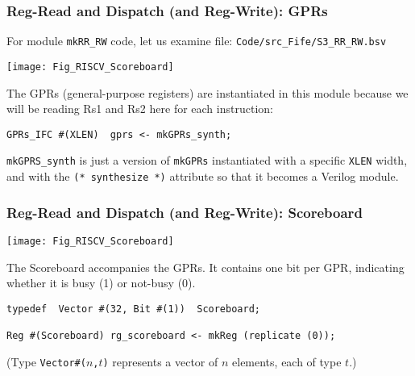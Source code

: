 \begin{frame}[fragile]
\frametitle{Reg-Read and Dispatch (and Reg-Write): GPRs}

\footnotesize

For module {\tt mkRR\_RW} code, let us examine file: {\tt Code/src\_Fife/S3\_RR\_RW.bsv}

\begin{center}
 \texttt{[image: Fig\_RISCV\_Scoreboard]}
\end{center}

\vspace{2ex}

The GPRs (general-purpose registers) are instantiated in this module
because we will be reading Rs1 and Rs2 here for each instruction:

\vspace{2ex}

\begin{Verbatim}[frame=single, label=From src\_Fife/CPU.bsv]
   GPRs_IFC #(XLEN)  gprs <- mkGPRs_synth;
\end{Verbatim}

\vspace{2ex}

{\tt mkGPRS\_synth} is just a version of {\tt mkGPRs} instantiated
with a specific {\tt XLEN} width, and with the {\tt (* synthesize *)}
attribute so that it becomes a Verilog module.

\end{frame}


\begin{frame}[fragile]
\frametitle{Reg-Read and Dispatch (and Reg-Write): Scoreboard}

\footnotesize

\begin{center}
 \texttt{[image: Fig\_RISCV\_Scoreboard]}
\end{center}

\vspace{2ex}

The Scoreboard accompanies the GPRs.  It contains one bit per GPR,
indicating whether it is busy (1) or not-busy (0).

\vspace{2ex}

\begin{Verbatim}[frame=single, label=From src\_Fife/CPU.bsv]
typedef  Vector #(32, Bit #(1))  Scoreboard;

Reg #(Scoreboard) rg_scoreboard <- mkReg (replicate (0));
\end{Verbatim}

\vspace{2ex}

(Type {\tt Vector\#($n$,$t$)} represents a vector of $n$ elements, each of type $t$.)

\end{frame}

